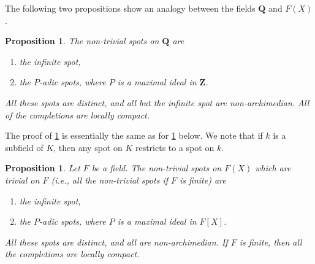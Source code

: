 \documentclass[10pt]{article}
\newtheorem{prop}[theo]{Proposition}
\theoremstyle{definition}
\def\ZZ{\mathbf{Z}}
\def\QQ{\mathbf{Q}}
\begin{document}
The following two propositions show an analogy between the fields $\QQ$ and $F(X)$.


\begin{prop}
\label{4.1.8}
The non-trivial spots on $\QQ$ are
\begin{enumerate}
\item
the infinite spot,

\item
the $P$-adic spots, where $P$ is a maximal ideal in $\ZZ$.
\end{enumerate}
All these spots are distinct, and all but the infinite spot are non-archimedian.
All of the completions are locally compact.
\end{prop}


The proof of \ref{4.1.8} is essentially the same as for \ref{4.1.9} below.
We note that if $k$ is a subfield of $K$, then any spot on $K$ restricts to a spot on $k$.


\begin{prop}
\label{4.1.9}
Let $F$ be a field.
The non-trivial spots on $F(X)$ which are trivial on $F$ (i.e., all the non-trivial spots if $F$ is finite) are
\begin{enumerate}
\item
the infinite spot,

\item
the $P$-adic spots, where $P$ is a maximal ideal in $F[X]$.
\end{enumerate}
All these spots are distinct, and all are non-archimedian.
If $F$ is finite, then all the completions are locally compact.
\end{prop}
\end{document}
